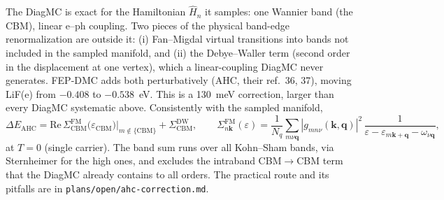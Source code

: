 \documentclass[11pt]{article}
\newcommand{\kv}{\mathbf{k}}
\newcommand{\qv}{\mathbf{q}}
\begin{document}
The DiagMC is exact for the Hamiltonian $\hat H_{n}$ it samples: one Wannier band (the CBM), linear e--ph coupling. Two pieces of the physical band-edge renormalization are outside it: (i) Fan--Migdal virtual transitions into bands not included in the sampled manifold, and (ii) the Debye--Waller term (second order in the displacement at one vertex), which a linear-coupling DiagMC never generates. FEP-DMC adds both perturbatively (AHC, their ref.~36, 37), moving LiF(e) from $-0.408$ to $-0.538$~eV. This is a 130~meV correction, larger than every DiagMC systematic above. Consistently with the sampled manifold,
\begin{equation}
  \Delta E_{\mathrm{AHC}} = \mathrm{Re}\,\Sigma^{\mathrm{FM}}_{\mathrm{CBM}}\bigl(\varepsilon_{\mathrm{CBM}}\bigr)\Big|_{m\notin\{\mathrm{CBM}\}} + \Sigma^{\mathrm{DW}}_{\mathrm{CBM}}, \qquad
  \Sigma^{\mathrm{FM}}_{n\kv}(\varepsilon)=\frac{1}{N_{q}}\sum_{m\nu\qv}|g_{mn\nu}(\kv,\qv)|^{2}\,\frac{1}{\varepsilon-\varepsilon_{m\kv+\qv}-\omega_{\nu\qv}} ,
\end{equation}
at $T=0$ (single carrier). The band sum runs over all Kohn--Sham bands, via Sternheimer for the high ones, and excludes the intraband CBM$\to$CBM term that the DiagMC already contains to all orders. The practical route and its pitfalls are in \texttt{plans/open/ahc-correction.md}.
\end{document}
